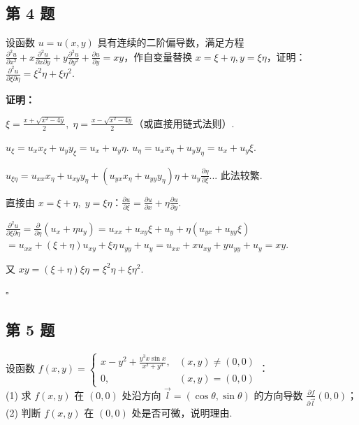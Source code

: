 \documentclass[12pt,a4paper]{article}
\newenvironment{sol}[1][解]{%
  \par\medskip\noindent\textbf{#1：}\itshape\par\noindent\ignorespaces
}{%
  \par\hfill$\square$\par\medskip
}
\begin{document}
\subsection*{第 4 题}
设函数 $u=u(x,y)$ 具有连续的二阶偏导数，满足方程 $\frac{\partial^2 u}{\partial
x^2}+x\frac{\partial^2 u}{\partial x \partial y}+y\frac{\partial^2
u}{\partial y^2}+\frac{\partial u}{\partial y}=xy$，作自变量替换
$x=\xi+\eta, y=\xi\eta$，证明：$\frac{\partial^2 u}{\partial \xi \partial
\eta}=\xi^2\eta+\xi\eta^2$.

\begin{sol}[证明]$\xi=\frac{x+\sqrt{x^2-4y}}{2},\;\eta=\frac{x-\sqrt{x^2-4y}}{2}$（或直接用链式法则）.

  $u_\xi=u_xx_\xi+u_yy_\xi=u_x+u_y\eta$.
  $u_\eta=u_xx_\eta+u_yy_\eta=u_x+u_y\xi$.

  $u_{\xi\eta}=u_{xx}x_\eta+u_{xy}y_\eta+(u_{yx}x_\eta+u_{yy}y_\eta)\eta+u_y\frac{\partial\eta}{\partial\xi}$...
  此法较繁.

  直接由 $x=\xi+\eta,\; y=\xi\eta$：$\frac{\partial
  u}{\partial\xi}=\frac{\partial u}{\partial x}+\eta\frac{\partial
  u}{\partial y}$.

  $\frac{\partial^2
  u}{\partial\xi\partial\eta}=\frac{\partial}{\partial\eta}(u_x+\eta
  u_y)=u_{xx}+u_{xy}\xi+u_y+\eta(u_{yx}+u_{yy}\xi)$
  $=u_{xx}+(\xi+\eta)u_{xy}+\xi\eta\,u_{yy}+u_y=u_{xx}+xu_{xy}+yu_{yy}+u_y=xy.$

  又 $xy=(\xi+\eta)\xi\eta=\xi^2\eta+\xi\eta^2$.
\end{sol}
\subsection*{第 5 题}
设函数 $f(x,y)=
\begin{cases}x-y^2+\frac{y^3x\sin x}{x^2+y^4}, & (x,y)\ne(0,0) \\ 0,
  & (x,y)=(0,0)
\end{cases}$：\\
(1) 求 $f(x,y)$ 在 $(0,0)$ 处沿方向 $\vec{l}=(\cos\theta,\sin\theta)$ 的方向导数
$\frac{\partial f}{\partial \vec{l}}(0,0)$；\\
(2) 判断 $f(x,y)$ 在 $(0,0)$ 处是否可微，说明理由.
\end{document}
